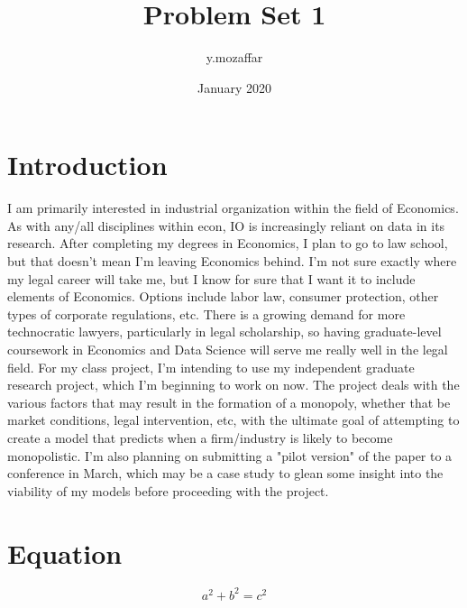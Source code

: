 \documentclass{article}
\title{Problem Set 1}
\author{y.mozaffar }
\date{January 2020}
\begin{document}
\maketitle

\section{Introduction}
I am primarily interested in industrial organization within the field of Economics. As with any/all disciplines within econ, IO is increasingly reliant on data in its research. After completing my degrees in Economics, I plan to go to law school, but that doesn't mean I'm leaving Economics behind. I'm not sure exactly where my legal career will take me, but I know for sure that I want it to include elements of Economics. Options include labor law, consumer protection, other types of corporate regulations, etc. There is a growing demand for more technocratic lawyers, particularly in legal scholarship, so having graduate-level coursework in Economics and Data Science will serve me really well in the legal field. 
For my class project, I'm intending to use my independent graduate research project, which I'm beginning to work on now. The project deals with the various factors that may result in the formation of a monopoly, whether that be market conditions, legal intervention, etc, with the ultimate goal of attempting to create a model that predicts when a firm/industry is likely to become monopolistic. I'm also planning on submitting a "pilot version" of the paper to a conference in March, which may be a case study to glean some insight into the viability of my models before proceeding with the project. 



\section{Equation}
\[a^2+b^2=c^2\]
\end{document}
